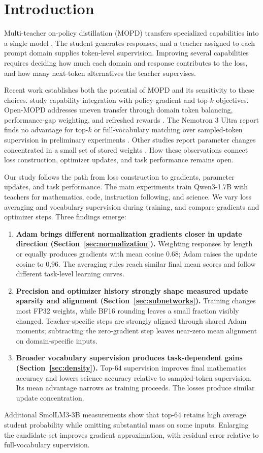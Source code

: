 \section{Introduction}
\label{sec:intro}

Multi-teacher on-policy distillation (MOPD) transfers specialized capabilities into a single model \citep{xiaomi2026mimov2flash,nvidia2026nemotron3ultra,kimiteam2026kimik3openfrontier,deepseekai2026deepseekv4highlyefficientmilliontoken}. The student generates responses, and a teacher assigned to each prompt domain supplies token-level supervision. Improving several capabilities requires deciding how much each domain and response contributes to the loss, and how many next-token alternatives the teacher supervises.

Recent work establishes both the potential of MOPD and its sensitivity to these choices. \citet{ma2026mopdmultiteacheronpolicydistillation} study capability integration with policy-gradient and top-$k$ objectives. Open-MOPD addresses uneven transfer through domain token balancing, performance-gap weighting, and refreshed rewards \citep{gao2026openmopddiagnosingfixingcapability}. The Nemotron 3 Ultra report finds no advantage for top-$k$ or full-vocabulary matching over sampled-token supervision in preliminary experiments \citep[Section~3.3.5]{nvidia2026nemotron3ultra}. Other studies report parameter changes concentrated in a small set of stored weights \citep{yu2026denseupdates,shen2026opdgeometry}. How these observations connect loss construction, optimizer updates, and task performance remains open.

Our study follows the path from loss construction to gradients, parameter updates, and task performance. The main experiments train Qwen3-1.7B with teachers for mathematics, code, instruction following, and science. We vary loss averaging and vocabulary supervision during training, and compare gradients and optimizer steps. Three findings emerge:
\begin{enumerate}
\item \textbf{Adam brings different normalization gradients closer in update direction (Section~\ref{sec:normalization}).}
Weighting responses by length or equally produces gradients with mean cosine 0.68; Adam raises the update cosine to 0.96. The averaging rules reach similar final mean scores and follow different task-level learning curves.
\item \textbf{Precision and optimizer history strongly shape measured update sparsity and alignment (Section~\ref{sec:subnetworks}).}
Training changes most FP32 weights, while BF16 rounding leaves a small fraction visibly changed. Teacher-specific steps are strongly aligned through shared Adam moments; subtracting the zero-gradient step leaves near-zero mean alignment on domain-specific inputs.
\item \textbf{Broader vocabulary supervision produces task-dependent gains (Section~\ref{sec:density}).}
Top-64 supervision improves final mathematics accuracy and lowers science accuracy relative to sampled-token supervision. Its mean advantage narrows as training proceeds. The losses produce similar update concentration.
\end{enumerate}

Additional SmolLM3-3B measurements show that top-64 retains high average student probability while omitting substantial mass on some inputs. Enlarging the candidate set improves gradient approximation, with residual error relative to full-vocabulary supervision. 